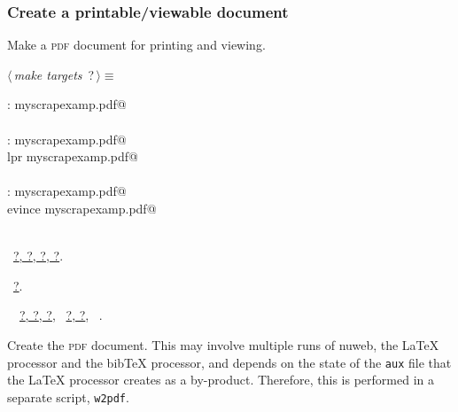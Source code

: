 \documentclass[twoside]{artikel3}
\newcommand{\pdf}{\textsc{pdf}}
\renewcommand{\NWlink}[2]{\hyperlink{#1}{#2}}
\renewcommand{\NWtarget}[2]{\hypertarget{#1}{#2}}
\renewcommand{\NWsep}{$\diamond$\rule[-1\baselineskip]{0pt}{1\baselineskip}}
\renewcommand{\NWlink}[2]{\hyperlink{#1}{#2}}
\renewcommand{\NWtarget}[2]{\hypertarget{#1}{#2}}
\begin{document}
\subsubsection{Create a printable/viewable document}
\label{sec:createpdf}

Make a \pdf{} document for printing and viewing.

\begin{flushleft} \small
\begin{minipage}{\linewidth}\label{scrap17}\raggedright\small
\NWtarget{nuweb?}{} $\langle\,${\itshape make targets}\nobreak\ {\footnotesize {?}}$\,\rangle\equiv$
\vspace{-1ex}
\begin{list}{}{} \item
\mbox{}\verb@pdf : myscrapexamp.pdf@\\
\mbox{}\verb@@\\
\mbox{}\verb@print : myscrapexamp.pdf@\\
\mbox{}\verb@        lpr myscrapexamp.pdf@\\
\mbox{}\verb@@\\
\mbox{}\verb@view : myscrapexamp.pdf@\\
\mbox{}\verb@        evince myscrapexamp.pdf@\\
\mbox{}\verb@@\\
\mbox{}\verb@@{\NWsep}
\end{list}
\vspace{-1.5ex}
\footnotesize
\begin{list}{}{\setlength{\itemsep}{-\parsep}\setlength{\itemindent}{-\leftmargin}}
\item \NWtxtMacroDefBy\ \NWlink{nuweb?}{?}\NWlink{nuweb?}{, ?}\NWlink{nuweb?}{, ?}\NWlink{nuweb?}{, ?}.
\item \NWtxtMacroRefIn\ \NWlink{nuweb?}{?}.
\item \NWtxtIdentsDefed\nobreak\  \verb@pdf@\nobreak\ \NWlink{nuweb?}{?}\NWlink{nuweb?}{, ?}\NWlink{nuweb?}{, ?}, \verb@print@\nobreak\ \NWlink{nuweb?}{?}\NWlink{nuweb?}{, ?}, \verb@view@\nobreak\ \NWtxtIdentsNotUsed.
\item{}
\end{list}
\end{minipage}\vspace{4ex}
\end{flushleft}
Create the \pdf{} document. This may involve multiple runs of nuweb,
the \LaTeX{} processor and the bib\TeX{} processor, and depends on the
state of the \verb|aux| file that the \LaTeX{} processor creates as a
by-product. Therefore, this is performed in a separate script,
\verb|w2pdf|.
\end{document}
